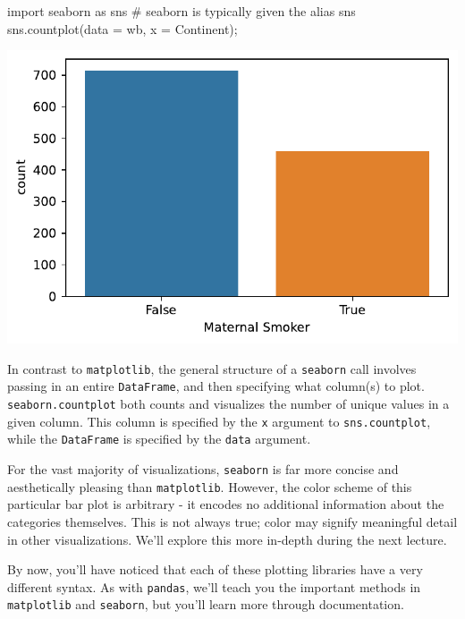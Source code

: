 \documentclass[
  letterpaper,
  DIV=11,
  numbers=noendperiod]{scrreprt}
\newenvironment{Shaded}{\begin{snugshade}}{\end{snugshade}}
\newcommand{\CommentTok}[1]{\textcolor[rgb]{0.37,0.37,0.37}{#1}}
\newcommand{\ImportTok}[1]{\textcolor[rgb]{0.00,0.46,0.62}{#1}}
\newcommand{\NormalTok}[1]{\textcolor[rgb]{0.00,0.23,0.31}{#1}}
\newcommand{\OperatorTok}[1]{\textcolor[rgb]{0.37,0.37,0.37}{#1}}
\newcommand{\StringTok}[1]{\textcolor[rgb]{0.13,0.47,0.30}{#1}}
\begin{document}
\begin{Shaded}
\begin{Highlighting}[]
\ImportTok{import}\NormalTok{ seaborn }\ImportTok{as}\NormalTok{ sns }\CommentTok{\# seaborn is typically given the alias sns}
\NormalTok{sns.countplot(data }\OperatorTok{=}\NormalTok{ wb, x }\OperatorTok{=} \StringTok{\textquotesingle{}Continent\textquotesingle{}}\NormalTok{)}\OperatorTok{;}
\end{Highlighting}
\end{Shaded}

\includegraphics{visualization_1/visualization_1_files/figure-pdf/cell-5-output-1.pdf}

In contrast to \texttt{matplotlib}, the general structure of a
\texttt{seaborn} call involves passing in an entire \texttt{DataFrame},
and then specifying what column(s) to plot. \texttt{seaborn.countplot}
both counts and visualizes the number of unique values in a given
column. This column is specified by the \texttt{x} argument to
\texttt{sns.countplot}, while the \texttt{DataFrame} is specified by the
\texttt{data} argument.

For the vast majority of visualizations, \texttt{seaborn} is far more
concise and aesthetically pleasing than \texttt{matplotlib}. However,
the color scheme of this particular bar plot is arbitrary - it encodes
no additional information about the categories themselves. This is not
always true; color may signify meaningful detail in other
visualizations. We'll explore this more in-depth during the next
lecture.

By now, you'll have noticed that each of these plotting libraries have a
very different syntax. As with \texttt{pandas}, we'll teach you the
important methods in \texttt{matplotlib} and \texttt{seaborn}, but
you'll learn more through documentation.
\end{document}
